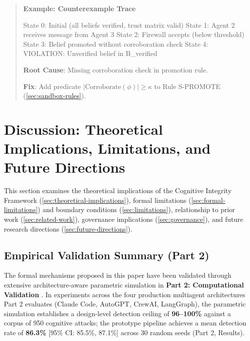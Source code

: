 \documentclass[
]{article}
\newenvironment{Shaded}{}{}
\newcommand{\NormalTok}[1]{#1}
\begin{document}
\begin{quote}
\textbf{Example: Counterexample Trace} \label{ex:counterexample}

\begin{Shaded}
\begin{Highlighting}[]
\NormalTok{State 0: Initial (all beliefs verified, trust matrix valid)}
\NormalTok{State 1: Agent 2 receives message from Agent 3}
\NormalTok{State 2: Firewall accepts (below threshold)}
\NormalTok{State 3: Belief promoted without corroboration check}
\NormalTok{State 4: VIOLATION: Unverified belief in B\_verified}
\end{Highlighting}
\end{Shaded}

\textbf{Root Cause}: Missing corroboration check in promotion rule.

\textbf{Fix}: Add predicate \(|\text{Corroborate}(\phi)| \geq \kappa\)
to Rule S-PROMOTE (\cref{sec:sandbox-rules}).
\end{quote}

\newpage

\newpage

\section{Discussion: Theoretical Implications, Limitations, and Future
Directions}\label{sec:discussion}

This section examines the theoretical implications of the Cognitive
Integrity Framework (\cref{sec:theoretical-implications}), formal
limitations (\cref{sec:formal-limitations}) and boundary conditions
(\cref{sec:limitations}), relationship to prior work
(\cref{sec:related-work}), governance implications
(\cref{sec:governance}), and future research directions
(\cref{sec:future-directions}).

\subsection{Empirical Validation Summary (Part
2)}\label{empirical-validation-summary-part-2}

The formal mechanisms proposed in this paper have been validated through
extensive architecture-aware parametric simulation in \textbf{Part 2:
Computational Validation} \cite{friedman2026cogsec2}. In experiments
across the four production multiagent architectures Part 2 evaluates
(Claude Code, AutoGPT, CrewAI, LangGraph), the parametric simulation
establishes a design-level detection ceiling of \textbf{96--100\%}
against a corpus of 950 cognitive attacks; the prototype pipeline
achieves a mean detection rate of \textbf{86.3\%} {[}95\% CI: 85.5\%,
87.1\%{]} across 30 random seeds (Part 2, Results).
\end{document}
